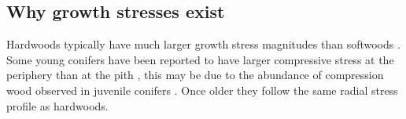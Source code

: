 \subsection{Why growth stresses exist}
Hardwoods typically have much larger growth stress magnitudes than softwoods \cite{barnett1981xylem}. Some young conifers have been
reported to have larger compressive stress at the periphery than at the pith \cite{jacobs1945l}, this may be due to the abundance of compression wood observed in juvenile conifers \cite{timell1986compression}. Once older they follow the same radial stress profile
as hardwoods.